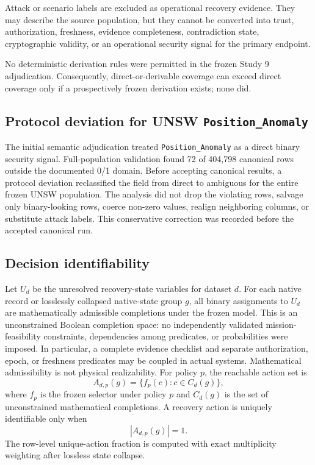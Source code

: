\documentclass[preprint,12pt]{elsarticle}
\begin{document}
Attack or scenario labels are excluded as operational recovery evidence. They may describe the source population, but they cannot be converted into trust, authorization, freshness, evidence completeness, contradiction state, cryptographic validity, or an operational security signal for the primary endpoint.

No deterministic derivation rules were permitted in the frozen Study 9 adjudication. Consequently, direct-or-derivable coverage can exceed direct coverage only if a prospectively frozen derivation exists; none did.

\subsection{Protocol deviation for UNSW \texttt{Position\_Anomaly}}

The initial semantic adjudication treated \texttt{Position\_Anomaly} as a direct binary security signal. Full-population validation found 72 of 404,798 canonical rows outside the documented 0/1 domain. Before accepting canonical results, a protocol deviation reclassified the field from direct to ambiguous for the entire frozen UNSW population. The analysis did not drop the violating rows, salvage only binary-looking rows, coerce non-zero values, realign neighboring columns, or substitute attack labels. This conservative correction was recorded before the accepted canonical run.

\subsection{Decision identifiability}

Let $U_d$ be the unresolved recovery-state variables for dataset $d$. For each native record or losslessly collapsed native-state group $g$, all binary assignments to $U_d$ are mathematically admissible completions under the frozen model. This is an unconstrained Boolean completion space: no independently validated mission-feasibility constraints, dependencies among predicates, or probabilities were imposed. In particular, a complete evidence checklist and separate authorization, epoch, or freshness predicates may be coupled in actual systems. Mathematical admissibility is not physical realizability. For policy $p$, the reachable action set is
\begin{equation}
\label{eq:reachable}
A_{d,p}(g)=\{f_p(c):c\in C_d(g)\},
\end{equation}
where $f_p$ is the frozen selector under policy $p$ and $C_d(g)$ is the set of unconstrained mathematical completions. A recovery action is uniquely identifiable only when
\begin{equation}
\label{eq:unique}
|A_{d,p}(g)|=1.
\end{equation}
The row-level unique-action fraction is computed with exact multiplicity weighting after lossless state collapse.
\end{document}
